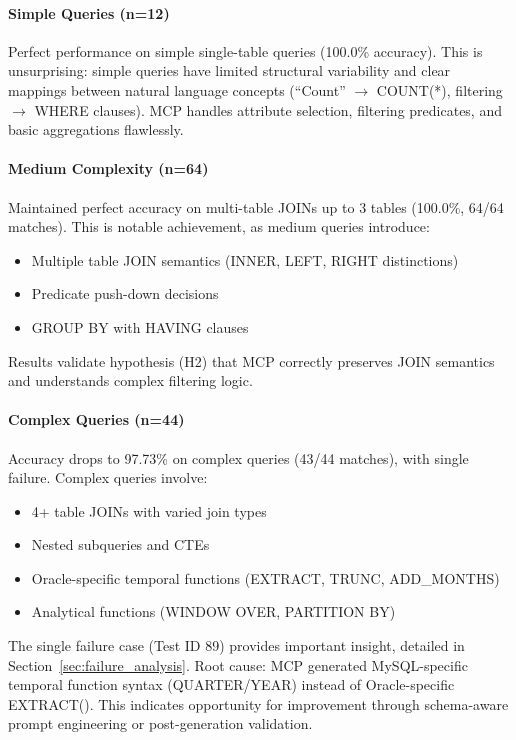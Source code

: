 

\paragraph{Simple Queries (n=12)}
Perfect performance on simple single-table queries (100.0\% accuracy). This is unsurprising: simple queries have limited structural variability and clear mappings between natural language concepts (``Count'' $\to$ COUNT(*), filtering $\to$ WHERE clauses). MCP handles attribute selection, filtering predicates, and basic aggregations flawlessly.

\paragraph{Medium Complexity (n=64)}
Maintained perfect accuracy on multi-table JOINs up to 3 tables (100.0\%, 64/64 matches). This is notable achievement, as medium queries introduce:
\begin{itemize}
    \item Multiple table JOIN semantics (INNER, LEFT, RIGHT distinctions)
    \item Predicate push-down decisions
    \item GROUP BY with HAVING clauses
\end{itemize}
Results validate hypothesis (H2) that MCP correctly preserves JOIN semantics and understands complex filtering logic.

\paragraph{Complex Queries (n=44)}
Accuracy drops to 97.73\% on complex queries (43/44 matches), with single failure. Complex queries involve:
\begin{itemize}
    \item 4+ table JOINs with varied join types
    \item Nested subqueries and CTEs
    \item Oracle-specific temporal functions (EXTRACT, TRUNC, ADD\_MONTHS)
    \item Analytical functions (WINDOW OVER, PARTITION BY)
\end{itemize}

The single failure case (Test ID 89) provides important insight, detailed in Section~\ref{sec:failure_analysis}. Root cause: MCP generated MySQL-specific temporal function syntax (QUARTER/YEAR) instead of Oracle-specific EXTRACT(). This indicates opportunity for improvement through schema-aware prompt engineering or post-generation validation.

